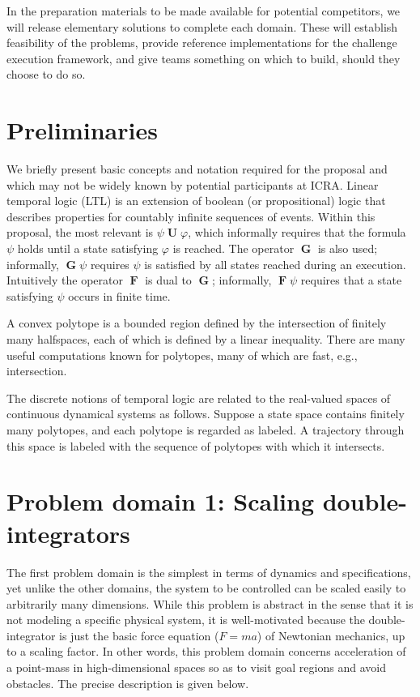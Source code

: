 \documentclass[12pt]{amsart}
\DeclareMathOperator{\Galways}{\mathbf{G}}
\DeclareMathOperator{\Feventually}{\mathbf{F}}
\DeclareMathOperator{\Uuntil}{\mathbf{U}}
\begin{document}
In the preparation materials to be made available for potential competitors, we
will release elementary solutions to complete each domain.  These will establish
feasibility of the problems, provide reference implementations for the challenge
execution framework, and give teams something on which to build, should they
choose to do so.


\section{Preliminaries}

We briefly present basic concepts and notation required for the proposal and
which may not be widely known by potential participants at ICRA.  Linear
temporal logic (LTL) is an extension of boolean (or propositional) logic that
describes properties for countably infinite sequences of events.  Within this
proposal, the most relevant is $\psi \Uuntil \varphi$, which informally requires
that the formula $\psi$ holds until a state satisfying $\varphi$ is reached.
The operator $\Galways$ is also used; informally, $\Galways \psi$ requires
$\psi$ is satisfied by all states reached during an execution.  Intuitively the
operator $\Feventually$ is dual to $\Galways$; informally, $\Feventually \psi$
requires that a state satisfying $\psi$ occurs in finite time.

A convex polytope is a bounded region defined by the intersection of finitely
many halfspaces, each of which is defined by a linear inequality.  There are
many useful computations known for polytopes, many of which are fast, e.g.,
intersection. \cite{Fukuda2004}

The discrete notions of temporal logic are related to the real-valued spaces of
continuous dynamical systems as follows.  Suppose a state space contains
finitely many polytopes, and each polytope is regarded as labeled.  A trajectory
through this space is labeled with the sequence of polytopes with which it
intersects.


\section{Problem domain 1: Scaling double-integrators}\label{sec:scalingdoubleinteg}

The first problem domain is the simplest in terms of dynamics and
specifications, yet unlike the other domains, the system to be controlled can be
scaled easily to arbitrarily many dimensions.  While this problem is abstract in
the sense that it is not modeling a specific physical system, it is
well-motivated because the double-integrator is just the basic force equation
($F=ma$) of Newtonian mechanics, up to a scaling factor.  In other words, this
problem domain concerns acceleration of a point-mass in high-dimensional spaces
so as to visit goal regions and avoid obstacles.  The precise description is
given below.
\end{document}
